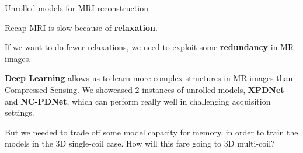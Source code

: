 \begin{frame}{Unrolled models for MRI reconstruction}
    \begin{block}{Recap}
        MRI is slow because of \textbf{relaxation}.
        
        \pause
        If we want to do fewer relaxations, we need to exploit some \textbf{redundancy} in MR images.
        
        \pause
        \textbf{Deep Learning} allows us to learn more complex structures in MR images than Compressed Sensing.
        We showcased 2 instances of unrolled models, \textbf{XPDNet} and \textbf{NC-PDNet}, which can perform really well in challenging acquisition settings.
    \end{block}

    \pause
    But we needed to trade off some model capacity for memory, in order to train the models in the 3D single-coil case.
    How will this fare going to 3D multi-coil?
\end{frame}
